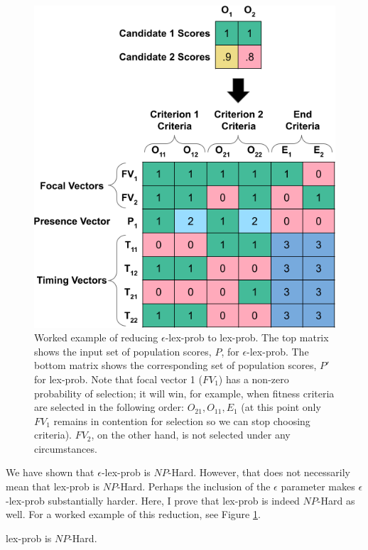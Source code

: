 \documentclass[sigconf]{acmart}
\begin{document}
\begin{figure}
    \centering
    \includegraphics[width=\linewidth]{figs/eps_to_lex_example.png}
    \caption{Worked example of reducing {\sc $\epsilon$-lex-prob} to {\sc lex-prob}. The top matrix shows the input set of population scores, $P$, for {\sc $\epsilon$-lex-prob}. The bottom matrix shows the corresponding set of population scores, $P'$ for {\sc lex-prob}. Note that focal vector 1 ($FV_1$) has a non-zero probability of selection; it will win, for example, when fitness criteria are selected in the following order: $O_{21}, O_{11}, E_{1}$ (at this point only $FV_1$ remains in contention for selection so we can stop choosing criteria). $FV_2$, on the other hand, is not selected under any circumstances.}
    \label{fig:eps_to_lex}
\end{figure}

We have shown that {\sc $\epsilon$-lex-prob} is $NP$-Hard. However, that does not necessarily mean that {\sc lex-prob} is $NP$-Hard. Perhaps the inclusion of the $\epsilon$ parameter makes {\sc $\epsilon$-lex-prob} substantially harder. Here, I prove that {\sc lex-prob} is indeed $NP$-Hard as well. For a worked example of this reduction, see Figure \ref{fig:eps_to_lex}. 

\begin{theorem}
\label{elexicasetheorem}
{\sc lex-prob} is $NP$-Hard.
\end{theorem}
\end{document}
